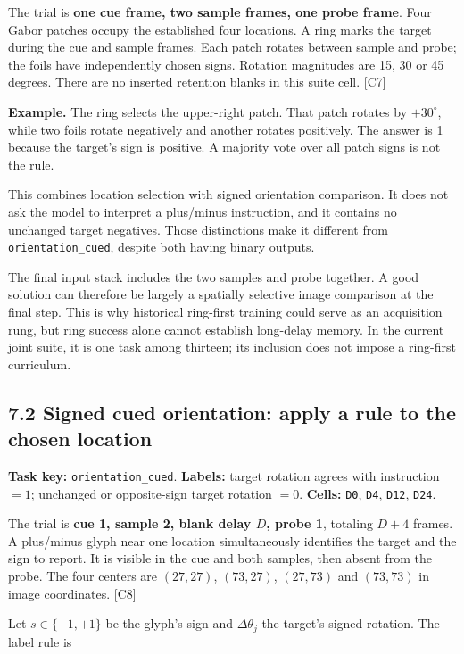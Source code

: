 \documentclass[
  11pt,
]{article}
\let\oldsubsection\subsection
\renewcommand{\subsection}{\Needspace{6\baselineskip}\oldsubsection}
\begin{document}
The trial is \textbf{one cue frame, two sample frames, one probe frame}.
Four Gabor patches occupy the established four locations. A ring marks
the target during the cue and sample frames. Each patch rotates between
sample and probe; the foils have independently chosen signs. Rotation
magnitudes are 15, 30 or 45 degrees. There are no inserted retention
blanks in this suite cell. {[}C7{]}

\textbf{Example.} The ring selects the upper-right patch. That patch
rotates by \(+30^\circ\), while two foils rotate negatively and another
rotates positively. The answer is 1 because the target's sign is
positive. A majority vote over all patch signs is not the rule.

This combines location selection with signed orientation comparison. It
does not ask the model to interpret a plus/minus instruction, and it
contains no unchanged target negatives. Those distinctions make it
different from \texttt{orientation\_cued}, despite both having binary
outputs.

The final input stack includes the two samples and probe together. A
good solution can therefore be largely a spatially selective image
comparison at the final step. This is why historical ring-first training
could serve as an acquisition rung, but ring success alone cannot
establish long-delay memory. In the current joint suite, it is one task
among thirteen; its inclusion does not impose a ring-first curriculum.

\subsection{7.2 Signed cued orientation: apply a rule to the chosen
location}\label{signed-cued-orientation-apply-a-rule-to-the-chosen-location}

\textbf{Task key:} \texttt{orientation\_cued}. \textbf{Labels:} target
rotation agrees with instruction \(=1\); unchanged or opposite-sign
target rotation \(=0\). \textbf{Cells:} \texttt{D0}, \texttt{D4},
\texttt{D12}, \texttt{D24}.

The trial is \textbf{cue 1, sample 2, blank delay \(D\), probe 1},
totaling \(D+4\) frames. A plus/minus glyph near one location
simultaneously identifies the target and the sign to report. It is
visible in the cue and both samples, then absent from the probe. The
four centers are \((27,27)\), \((73,27)\), \((27,73)\) and \((73,73)\)
in image coordinates. {[}C8{]}

Let \(s\in\{-1,+1\}\) be the glyph's sign and \(\Delta\theta_j\) the
target's signed rotation. The label rule is
\end{document}
